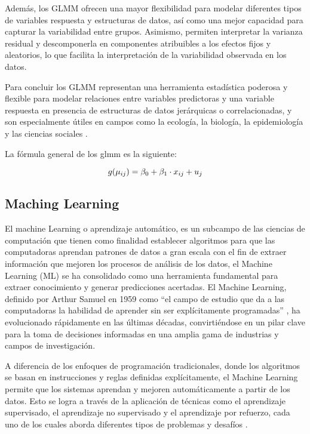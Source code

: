 \documentclass[
  11pt,
  bookmarksnumbered]{article}
\begin{document}
Además, los GLMM ofrecen una mayor flexibilidad para modelar diferentes tipos de variables respuesta y estructuras de datos, así como una mejor capacidad para capturar la variabilidad entre grupos.
Asimismo, permiten interpretar la varianza residual y descomponerla en componentes atribuibles a los efectos fijos y aleatorios, lo que facilita la interpretación de la variabilidad observada en los datos.

Para concluir los GLMM representan una herramienta estadística poderosa y flexible para modelar relaciones entre variables predictoras y una variable respuesta en presencia de estructuras de datos jerárquicas o correlacionadas, y son especialmente útiles en campos como la ecología, la biología, la epidemiología y las ciencias sociales \textcite{zuur2009mixed}.

La fórmula general de los glmm es la siguiente: 

\begin{equation}
\large g(\mu_{ij}) = \beta_0 + \beta_1 \cdot x_{ij} + u_{j}\end{equation}

\hypertarget{maching-learning}{%
\subsection{Maching Learning}\label{maching-learning}}

El machine Learning o aprendizaje automático, es un subcampo de las ciencias de computación que tienen como finalidad establecer algoritmos para que las computadoras aprendan patrones de datos a gran escala con el fin de extraer información que mejoren los procesos de análisis de los datos, el Machine Learning (ML) se ha consolidado como una herramienta fundamental para extraer conocimiento y generar predicciones acertadas.
El Machine Learning, definido por Arthur Samuel en 1959 como ``el campo de estudio que da a las computadoras la habilidad de aprender sin ser explícitamente programadas'' \textcite{Samuel1959}, ha evolucionado rápidamente en las últimas décadas, convirtiéndose en un pilar clave para la toma de decisiones informadas en una amplia gama de industrias y campos de investigación.

A diferencia de los enfoques de programación tradicionales, donde los algoritmos se basan en instrucciones y reglas definidas explícitamente, el Machine Learning permite que los sistemas aprendan y mejoren automáticamente a partir de los datos.
Esto se logra a través de la aplicación de técnicas como el aprendizaje supervisado, el aprendizaje no supervisado y el aprendizaje por refuerzo, cada uno de los cuales aborda diferentes tipos de problemas y desafíos \textcite{Hastie2009}.
\end{document}
